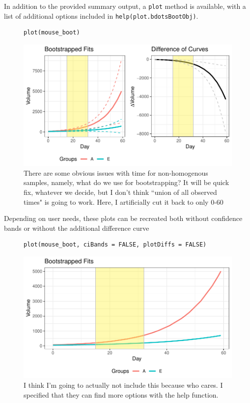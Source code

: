 \documentclass{article}
\newcommand{\xt}{\texttt}%
\begin{document}
In addition to the provided summary output, a \xt{plot} method is available, with a list of additional options included in \xt{help(plot.bdotsBootObj)}.

\begin{figure}[H]
\centering
\begin{BVerbatim}
plot(mouse_boot)
\end{BVerbatim}

\includegraphics{img/mouse_boot_plot.pdf}
\caption{There are some obvious issues with time for non-homogenous samples, namely, what do we use for bootstrapping? It will be quick fix, whatever we decide, but I don't think ``union of all observed times" is going to work. Here, I artificially cut it back to only 0-60}
\end{figure}

Depending on user needs, these plots can be recreated both without confidence bands or without the additional difference curve

\begin{figure}[H]
\centering
\begin{BVerbatim}
plot(mouse_boot, ciBands = FALSE, plotDiffs = FALSE)

\end{BVerbatim}

\includegraphics{img/mouse_boot_plot_extra.pdf}
\caption{I think I'm going to actually not include this because who cares. I specified that they can find more options with the help function.}
\end{figure}
\end{document}
